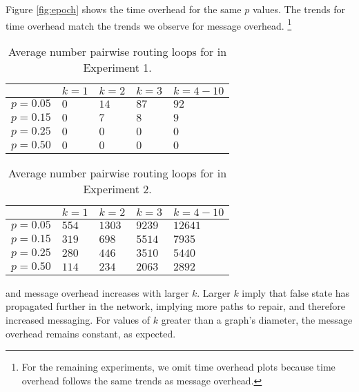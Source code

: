 Figure \ref{fig:epoch} shows the time overhead for the same $p$ values. The trends for time overhead match the trends we observe for message overhead. 
{\footnote {\small For the remaining experiments, we omit time overhead plots because time overhead follows the same trends as message overhead.}}


\begin{table}
\begin{center}
\begin{tabular}{l|l|l|l|l}
 & $k=1$&  $k=2$ & $k=3$ & $k=4-10$ \\
\hline
 $p=0.05$  & $0$ & $14$ & $87$ &  $92$ \\
 $p=0.15$  & $0$ & $7$&  $8$ & $9$ \\
 $p=0.25$  & $0$ & $0$ & $0$ &  $0$ \\
 $p=0.50$  & $0$ & $0$ & $0$ &  $0$ \\
\end{tabular}
\end{center}
\caption{Average number pairwise routing loops for \second in Experiment 1.}
\label{tab:loop1}
\end{table}

\begin{table}
\begin{center}
\begin{tabular}{l|l|l|l|l}
 & $k=1$&  $k=2$ & $k=3$ & $k=4-10$ \\
\hline
  $p=0.05$  & $554$ & $1303$ & $9239$ &  $12641$ \\
 $p=0.15$  & $319$ & $698$&  $5514$ & $7935$ \\
 $p=0.25$  & $280$ & $446$ & $3510$ &  $5440$ \\
 $p=0.50$  & $114$ & $234$ & $2063$ &  $2892$ \\
\end{tabular}
\end{center}
\caption{Average number pairwise routing loops for \second in Experiment 2.}
\label{tab:loop2}
\end{table}


\purge and \second message overhead increases with larger $k$. Larger $k$ imply that false state has propagated further in the network, 
implying more paths to repair, and therefore increased messaging.
For values of $k$ greater than a graph's diameter, the message overhead remains constant, as expected. 

